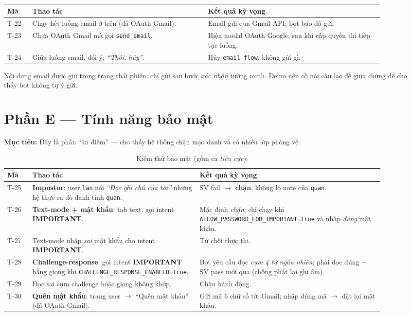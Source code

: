 \documentclass[12pt,a4paper]{article}
\newcommand{\role}[1]{\par\smallskip\noindent\textbf{\textcolor{hdr}{Mục tiêu:}} #1\par\smallskip}
\newcommand{\say}[1]{\textit{``#1''}}
\newcommand{\imp}{\textcolor{importantc}{\textbf{IMPORTANT}}}
\begin{document}
\begin{table}[H]
\centering\small
\begin{tabular}{p{0.06\linewidth}p{0.42\linewidth}p{0.42\linewidth}}
\toprule
\textbf{Mã} & \textbf{Thao tác} & \textbf{Kết quả kỳ vọng} \\
\midrule
T-22 & Chạy hết luồng email ở trên (đã OAuth Gmail). & Email gửi qua Gmail API; bot báo đã gửi. \\
T-23 & Chưa OAuth Gmail mà gọi \texttt{send\_email}. & Hiện modal OAuth Google; sau khi cấp quyền thì tiếp tục luồng. \\
T-24 & Giữa luồng email, đổi ý: \say{Thôi, hủy}. & Hủy \texttt{email\_flow}, không gửi gì. \\
\bottomrule
\end{tabular}
\end{table}

\begin{luuybox}
Nội dung email được giữ trong trạng thái phiên; chỉ gửi sau bước \emph{xác nhận}
tường minh. Demo nên cố nói câu lạc đề giữa chừng để cho thấy bot không tự ý gửi.
\end{luuybox}

\section{Phần E --- Tính năng bảo mật}
\role{Đây là phần ``ăn điểm'' --- cho thấy hệ thống chặn mạo danh và có nhiều
lớp phòng vệ.}

\begin{table}[H]
\centering\small
\caption{Kiểm thử bảo mật (gồm ca \emph{tiêu cực}).}
\begin{tabular}{p{0.06\linewidth}p{0.40\linewidth}p{0.44\linewidth}}
\toprule
\textbf{Mã} & \textbf{Thao tác} & \textbf{Kết quả kỳ vọng} \\
\midrule
T-25 & \textbf{Impostor}: user \texttt{lan} nói \say{Đọc ghi chú của tôi} nhưng
hệ thực ra dò danh tính \texttt{quan}. & SV fail $\to$ \textbf{chặn}, không lộ
note của \texttt{quan}. \\
T-26 & \textbf{Text-mode + mật khẩu}: tab text, gọi intent \imp{}. & Mặc định
\emph{chặn}; chỉ chạy khi \texttt{ALLOW\_PASSWORD\_FOR\_IMPORTANT=true} và nhập
\emph{đúng} mật khẩu. \\
T-27 & Text-mode nhập \emph{sai} mật khẩu cho intent \imp{}. & Từ chối thực thi. \\
T-28 & \textbf{Challenge-response}: gọi intent \imp{} bằng giọng khi
\texttt{CHALLENGE\_RESPONSE\_ENABLED=true}. & Bot yêu cầu đọc \emph{cụm 4 từ ngẫu
nhiên}; phải đọc đúng + SV pass mới qua (chống phát lại ghi âm). \\
T-29 & Đọc sai cụm challenge hoặc giọng không khớp. & Chặn hành động. \\
T-30 & \textbf{Quên mật khẩu}: trang user $\to$ ``Quên mật khẩu'' (đã OAuth Gmail). &
Gửi mã 6 chữ số tới Gmail; nhập đúng mã $\to$ đặt lại mật khẩu. \\
\bottomrule
\end{tabular}
\end{table}
\end{document}
